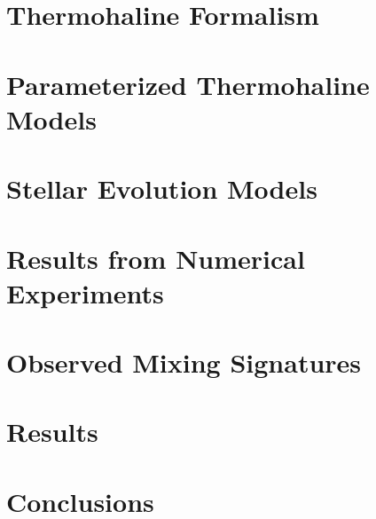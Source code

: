 \documentclass[twocolumn,linenumbers]{aastex62}
\begin{document}
\section{Thermohaline Formalism } %
\label{sec:formalism}


\section{Parameterized Thermohaline Models } %
\label{sec:parameterizations}


\section{Stellar Evolution Models}%
\label{sec:mesa_experiment}


\section{Results from Numerical Experiments }
\label{sec:mesa_results}


\section{Observed Mixing Signatures }
\label{sec:obs}


\section{Results} 
\label{sec:punchline}


\section{Conclusions }
\label{sec:conclusions}



\begin{comment}
\begin{figure}[!htb]
\begin{center}
\texttt{[image: ./Figs/protversusloggmodelpmmPYboth.eps]}%
\caption{The measured core rotation rates for the stars in our sample as a function of gravity compared to the predictions of our solid body model (lue) and our moerately differentially convection zone (pink), showing that these models provide limits on the allowable amount of radial differential rotation in the surface convection zone.}
\label{Fig:bothmodels}
\end{center}
\end{figure}
\end{comment}
\end{document}
